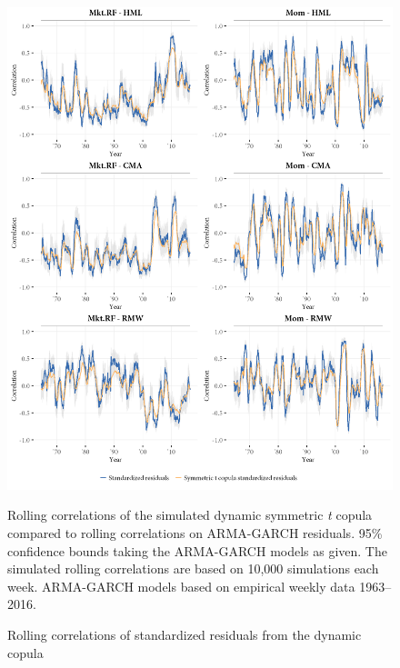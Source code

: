 \begin{figure}[!ht]
  \centering
  \includegraphics[width=\textwidth]{graphics/rolling_simulated1.png}
  \footnotesize
  \caption{Rolling correlations of standardized residuals from the dynamic copula}

  \begin{longcaption}
    Rolling correlations of the simulated dynamic symmetric \textit{t} copula compared to rolling correlations on ARMA-GARCH residuals. 95\% confidence bounds taking the ARMA-GARCH models as given. The simulated rolling correlations are based on 10,000 simulations each week. ARMA-GARCH models based on empirical weekly data 1963--2016.
  \end{longcaption}
  \label{fig:rolling_simulated}
\end{figure}
